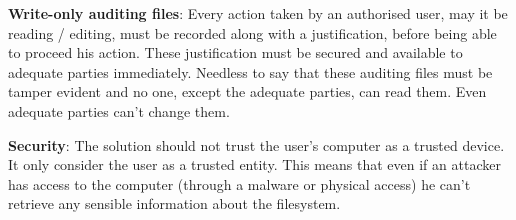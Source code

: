 \documentclass[../main.tex]{subfiles}
\begin{document}
\par \textbf{Write-only auditing files}: Every action taken by an authorised user, may it be reading / editing, must be recorded along with a justification, before being able to proceed his action. These justification must be secured and available to adequate parties immediately. Needless to say that these auditing files must be tamper evident and no one, except the adequate parties, can read them. Even adequate parties can't change them.
\par \textbf{Security}: The solution should not trust the user's computer as a trusted device. It only consider the user as a trusted entity. This means that even if an attacker has access to the computer (through a malware or physical access) he can't retrieve any sensible information about the filesystem.
\end{document}
